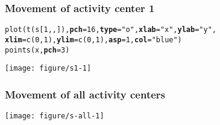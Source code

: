 \documentclass[color=usenames,dvipsnames]{beamer}\usepackage[]{graphicx}\usepackage[]{xcolor}
\makeatletter
\newcommand{\hlnum}[1]{\textcolor[rgb]{0.69,0.494,0}{#1}}%
\newcommand{\hlsng}[1]{\textcolor[rgb]{0.749,0.012,0.012}{#1}}%
\newcommand{\hldef}[1]{\textcolor[rgb]{0,0,0}{#1}}%
\newcommand{\hlkwc}[1]{\textcolor[rgb]{0,0,0}{\textbf{#1}}}%
\newcommand{\hlkwd}[1]{\textcolor[rgb]{0.004,0.004,0.506}{#1}}%
\newenvironment{kframe}{%
 \def\at@end@of@kframe{}%
 \ifinner\ifhmode%
  \def\at@end@of@kframe{\end{minipage}}%
  \begin{minipage}{\columnwidth}%
 \fi\fi%
 \def\FrameCommand##1{\hskip\@totalleftmargin \hskip-\fboxsep
 \colorbox{shadecolor}{##1}\hskip-\fboxsep
     \hskip-\linewidth \hskip-\@totalleftmargin \hskip\columnwidth}%
 \MakeFramed {\advance\hsize-\width
   \@totalleftmargin\z@ \linewidth\hsize
   \@setminipage}}%
 {\par\unskip\endMakeFramed%
 \at@end@of@kframe}
\newenvironment{knitrout}{}{} %
\makeatother
\begin{document}
\begin{frame}[fragile]
  \frametitle{Movement of activity center 1}
\begin{knitrout}\scriptsize
{}\color{fgcolor}\begin{kframe}
\begin{alltt}
\hlkwd{plot}\hldef{(}\hlkwd{t}\hldef{(s[}\hlnum{1}\hldef{,,]),} \hlkwc{pch}\hldef{=}\hlnum{16}\hldef{,} \hlkwc{type}\hldef{=}\hlsng{"o"}\hldef{,} \hlkwc{xlab}\hldef{=}\hlsng{"x"}\hldef{,} \hlkwc{ylab}\hldef{=}\hlsng{"y"}\hldef{,}
     \hlkwc{xlim}\hldef{=}\hlkwd{c}\hldef{(}\hlnum{0}\hldef{,} \hlnum{1}\hldef{),} \hlkwc{ylim}\hldef{=}\hlkwd{c}\hldef{(}\hlnum{0}\hldef{,} \hlnum{1}\hldef{),} \hlkwc{asp}\hldef{=}\hlnum{1}\hldef{,} \hlkwc{col}\hldef{=}\hlsng{"blue"}\hldef{)}
\hlkwd{points}\hldef{(x,} \hlkwc{pch}\hldef{=}\hlnum{3}\hldef{)}
\end{alltt}
\end{kframe}

{\centering \texttt{[image: figure/s1-1]} 

}


\end{knitrout}
\end{frame}





\begin{frame}[fragile]
  \frametitle{Movement of all activity centers}
\begin{knitrout}\scriptsize
{}\color{fgcolor}

{\centering \texttt{[image: figure/s-all-1]} 

}


\end{knitrout}
\end{frame}
\end{document}

